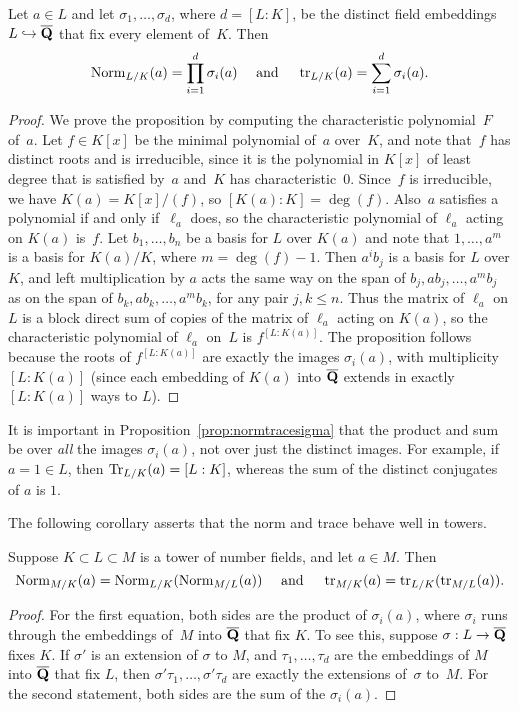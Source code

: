 \begin{proposition}\label{prop:normtracesigma}
Let $a\in L$ and let $\sigma_1,\ldots, \sigma_d$, where $d=[L:K]$, be
the distinct field embeddings $L\hookrightarrow \overline{\mathbf{Q}}$ that fix every element
of~$K$.  Then
$$
\operatorname{Norm}_{L/K}(a) = \prod_{i=1}^d \sigma_i(a)
\quad\text{ and }\quad
\operatorname{tr}_{L/K}(a) = \sum_{i=1}^d \sigma_i(a).
$$
\end{proposition}
\begin{proof}
  We prove the proposition by computing the characteristic
  polynomial~$F$ of~$a$.  Let $f\in K[x]$ be the minimal polynomial
  of~$a$ over~$K$, and note that~$f$ has distinct roots and is
  irreducible, since it is the polynomial in $K[x]$ of least degree
  that is satisfied by~$a$ and~$K$ has characteristic~$0$.  Since~$f$
  is irreducible, we have $K(a) = K[x]/(f)$, so $[K(a):K]=\deg(f)$.
  Also~$a$ satisfies a polynomial if and only if~$\ell_a$ does, so the
  characteristic polynomial of $\ell_a$ acting on $K(a)$ is~$f$.  Let
  $b_1,\ldots,b_n$ be a basis for $L$ over $K(a)$ and note that
  $1,\ldots, a^m$ is a basis for $K(a)/K$, where $m=\deg(f)-1$.  Then
  $a^i b_j$ is a basis for $L$ over $K$, and left multiplication by
  $a$ acts the same way on the span of $b_j, a b_j, \ldots, a^m b_j$
  as on the span of $b_k, a b_k, \ldots, a^m b_k$, for any pair $j,
  k\leq n$.  Thus the matrix of $\ell_a$ on $L$ is a block direct sum
  of copies of the matrix of $\ell_a$ acting on $K(a)$, so the
  characteristic polynomial of $\ell_a$ on~$L$ is $f^{[L:K(a)]}$.  The
  proposition follows because the roots of $f^{[L:K(a)]}$ are exactly
  the images $\sigma_i(a)$, with multiplicity $[L:K(a)]$ (since each
  embedding of $K(a)$ into $\overline{\mathbf{Q}}$ extends in exactly $[L:K(a)]$ ways
  to $L$).
\end{proof}

It is important in Proposition~\ref{prop:normtracesigma} that
the product and sum be over {\em all} the images $\sigma_i(a)$,
not over just the distinct images.  For example, if $a=1\in L$, then
$\operatorname{Tr}_{L/K}(a) = [L:K]$, whereas the sum of the distinct conjugates
of $a$ is $1$.

The following corollary asserts that the norm and trace behave well in
towers.
\begin{corollary}
Suppose $K\subset L \subset M$ is a tower of number fields, and
let $a\in M$.  Then 
$$
\operatorname{Norm}_{M/K}(a) = \operatorname{Norm}_{L/K}(\operatorname{Norm}_{M/L}(a))
\quad\text{ and }\quad
\operatorname{tr}_{M/K}(a) = \operatorname{tr}_{L/K}(\operatorname{tr}_{M/L}(a)).
$$
\end{corollary}
\begin{proof}
  For the first equation, both sides are the product of $\sigma_i(a)$,
  where $\sigma_i$ runs through the embeddings of~$M$ into $\overline{\mathbf{Q}}$
  that fix $K$.  To see this, suppose $\sigma:L\to \overline{\mathbf{Q}}$ fixes $K$.
  If $\sigma'$ is an extension of $\sigma$ to $M$, and $\tau_1,\ldots,
  \tau_d$ are the embeddings of $M$ into $\overline{\mathbf{Q}}$ that fix $L$, then
  $\sigma'\tau_1,\ldots,\sigma'\tau_d$ are exactly the extensions
  of~$\sigma$ to~$M$.  For the second statement, both sides are the
  sum of the $\sigma_i(a)$.
\end{proof}

